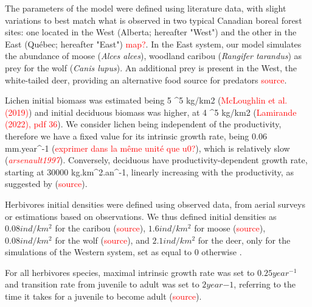 The parameters of the model were defined using literature data, with slight variations to best match what is observed in two typical Canadian boreal forest sites: one located in the West (Alberta; hereafter "West") and the other in the East (Québec; hereafter "East") \textcolor{red}{map?}. In the East system, our model simulates the abundance of moose (\textit{Alces alces}), woodland caribou (\textit{Rangifer tarandus}) as prey for the wolf (\textit{Canis lupus}). An additional prey is present in the West, the white-tailed deer, providing an alternative food source for predators \textcolor{red}{source}. 


Lichen initial biomass was estimated being 5 ^5 kg/km2 (\textcolor{red}{McLoughlin et al. (2019)}) and initial deciduous biomass was higher, at 4 ^5 kg/km2 (\textcolor{red}{Lamirande (2022), pdf 36}). We consider lichen being independent of the productivity, therefore we have a fixed value for its intrinsic growth rate, being 0.06 mm.year^{-1} (\textcolor{red}{exprimer dans la même unité que u0?}), which is relatively slow (\textcolor{red}{\emph{arsenault1997}}). Conversely, deciduous have productivity-dependent growth rate, starting at 30000 kg.km^2.an^{-1}, linearly increasing with the productivity, as suggested by (\textcolor{red}{source}). 




Herbivores initial densities were defined using observed data, from aerial surveys or estimations based on observations. We thus defined initial densities as $0.08 ind/km^2$ for the caribou (\textcolor{red}{source}), $1.6 ind/km^2$ for moose (\textcolor{red}{source}), $0.08 ind/km^2$ for the wolf (\textcolor{red}{source}), and $2.1 ind/km^2$ for the deer, only for the simulations of the Western system, set as equal to 0 otherwise . 

For all herbivores species, maximal intrinsic growth rate was set to $0.25 year^{-1}$ and transition rate from juvenile to adult was set to $2 year{-1}$, referring to the time it takes for  a juvenile to become adult (\textcolor{red}{source}). 

